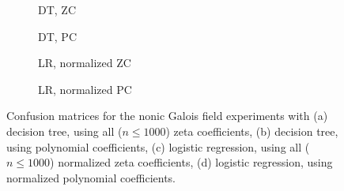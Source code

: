 \documentclass[letterpaper, 10pt]{article}
\newcommand{\1}{\mathds{1}}	%
\theoremstyle{definition}
\theoremstyle{remark}
\begin{document}
\begin{figure}[h]
    \centering
    \begin{subfigure}[t]{0.23\textwidth}
        \centering
        \caption{DT, ZC}
        \label{fig:nonic_dt_zc}
    \end{subfigure}
    \hfill
    \begin{subfigure}[t]{0.23\textwidth}
        \centering
        \caption{DT, PC}
        \label{fig:nonic_dt_pc}
    \end{subfigure}
    \hfill
    \begin{subfigure}[t]{0.23\textwidth}
        \centering
        \caption{LR, normalized ZC}
        \label{fig:nonic_lr_zc_normalized}
    \end{subfigure}
    \hfill
    \begin{subfigure}[t]{0.23\textwidth}
        \centering
        \caption{LR, normalized PC}
        \label{fig:nonic_lr_pc_normalized}
    \end{subfigure}
    \caption{Confusion matrices for the nonic Galois field experiments with (a) decision tree, using all ($n \le 1000$) zeta coefficients, (b) decision tree, using polynomial coefficients, (c) logistic regression, using all ($n \le 1000$) normalized zeta coefficients, (d) logistic regression, using normalized polynomial coefficients.}
    \label{fig:galois_9_cm}
\end{figure}
\end{document}
